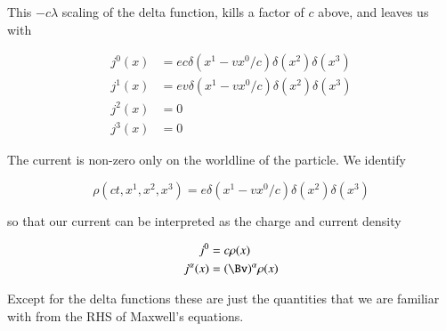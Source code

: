 This \(- c\lambda\) scaling of the delta function, kills a factor of \(c \) above, and leaves us with

\begin{equation}\label{eqn:relativisticElectrodynamicsL12b:530}
\begin{aligned}
j^0(x) &= e c \delta(x^1 - v x^0/c) \delta(x^2) \delta(x^3) \\
j^1(x) &= e v \delta(x^1 - v x^0/c) \delta(x^2) \delta(x^3) \\
j^2(x) &= 0 \\
j^3(x) &= 0
\end{aligned}
\end{equation}

The current is non-zero only on the worldline of the particle.  We identify

\begin{equation}\label{eqn:relativisticElectrodynamicsL12b:550}
\rho(ct, x^1, x^2, x^3) = e \delta(x^1 - v x^0/c) \delta(x^2) \delta(x^3)
\end{equation}

so that our current can be interpreted as the charge and current density

\begin{equation}\label{eqn:relativisticElectrodynamicsL12b:570}
\begin{aligned}
j^0 &= c \rho(x) \\
j^\alpha(x) &= (\Bv)^\alpha \rho(x)
\end{aligned}
\end{equation}

Except for the delta functions these are just the quantities that we are familiar with from the RHS of Maxwell's equations.
